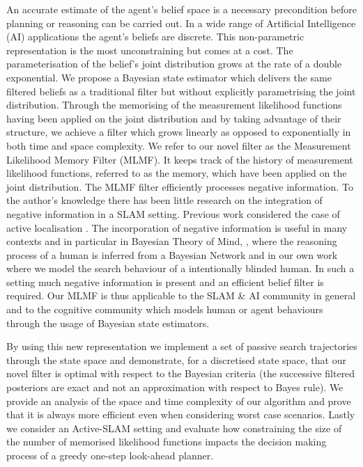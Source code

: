 An accurate estimate of the agent's belief space is a necessary precondition before planning or reasoning can be carried out.
In a wide range of Artificial Intelligence (AI) applications the agent's beliefs are discrete. This non-parametric representation
is the most unconstraining but comes at a cost. The parameterisation of the belief's joint distribution grows at the rate of a double exponential.
We propose a Bayesian state estimator which delivers the same filtered beliefs as a traditional filter but without explicitly parametrising the 
joint distribution. Through the memorising of the measurement likelihood functions having been applied on the joint distribution 
and by taking advantage of their structure, we achieve a filter which grows linearly as opposed to exponentially 
in both time and space complexity. We refer to our novel filter as the Measurement Likelihood Memory Filter (MLMF). 
It keeps track of the history of measurement likelihood functions, referred to as the memory, which 
have been applied on the joint distribution.
The MLMF filter efficiently processes negative information. To the author's knowledge there has been little
research on the integration of negative information in a SLAM setting. Previous work considered the case of active localisation \cite{NegInfoFurtherStudies}.
The incorporation of negative information is useful in many contexts and in particular in Bayesian Theory of Mind, \cite{Bake_Saxe_Tene_2011},
where the reasoning process of a human is inferred from a Bayesian Network and in our own work \cite{deChambrier2013} where we model the 
search behaviour of a intentionally blinded human. In such a setting much negative information is present and an efficient belief filter is required. 
Our MLMF is thus applicable to the SLAM \& AI community in general and to the cognitive community which models human or agent behaviours through 
the usage of Bayesian state estimators.

By using this new representation we implement a set of passive search trajectories through the state 
space and demonstrate, for a discretised state space, that our novel filter is optimal with respect to the Bayesian criteria (the successive
filtered posteriors are exact and not an approximation with respect to Bayes rule). We provide an analysis of the space and time complexity of 
our algorithm and prove that it is always more efficient even when considering worst case scenarios.
Lastly we consider an Active-SLAM setting and evaluate how constraining the size of the number of memorised likelihood 
functions impacts the decision making process of a greedy one-step look-ahead planner.


